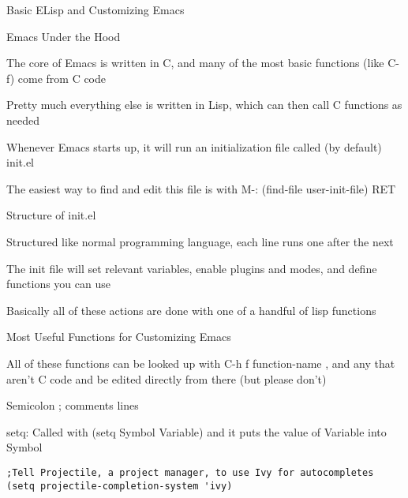 \documentclass[presentation]{beamer}
\begin{document}
\begin{frame}[fragile,label=sec-5]{Basic ELisp and Customizing Emacs}
 \begin{block}{Emacs Under the Hood}
\begin{block}{The core of Emacs is written in C, and many of the most basic functions (like C-f) come from C code}
\end{block}
\begin{block}{Pretty much everything else is written in Lisp, which can then call C functions as needed}
\end{block}
\begin{block}{Whenever Emacs starts up, it will run an initialization file called (by default) init.el}
\end{block}
\begin{block}{The easiest way to find and edit this file is with M-: (find-file user-init-file) RET}
\end{block}
\end{block}
\begin{block}{Structure of init.el}
\begin{block}{Structured like normal programming language, each line runs one after the next}
\end{block}
\begin{block}{The init file will set relevant variables, enable plugins and modes, and define functions you can use}
\end{block}
\begin{block}{Basically all of these actions are done with one of a handful of lisp functions}
\end{block}
\end{block}
\begin{block}{Most Useful Functions for Customizing Emacs}
\begin{block}{All of these functions can be looked up with C-h f function-name , and any that aren't C code and be edited directly from there (but please don't)}
\end{block}
\begin{block}{Semicolon ; comments lines}
\end{block}
\begin{block}{setq: Called with (setq Symbol Variable) and it puts the value of Variable into Symbol}
\begin{verbatim}
;Tell Projectile, a project manager, to use Ivy for autocompletes
(setq projectile-completion-system 'ivy)
\end{verbatim}
\end{block}

\end{block}
\end{frame}
\end{document}

